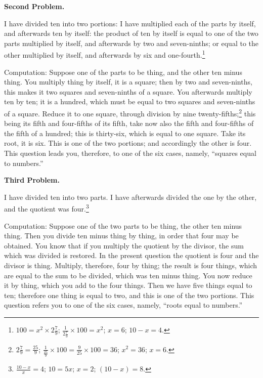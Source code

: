 \vspace{0.3cm}
\noindent\textbf{Second Problem.}

I have divided ten into two portions: I have multiplied each of the parts by itself, and afterwards ten by itself: the product of ten by itself is equal to one of the two parts multiplied by itself, and afterwards by two and seven-ninths; or equal to the other multiplied by itself, and afterwards by six and one-fourth.\footnote{$100 = x^2 \times 2\frac{7}{9}$; $\frac{1}{2\frac{7}{9}} \times 100 = x^2$; $x = 6$; $10 - x = 4$.}

Computation: Suppose one of the parts to be thing, and the other ten minus thing. You multiply thing by itself, it is a square; then by two and seven-ninths, this makes it two squares and seven-ninths of a square. You afterwards multiply ten by ten; it is a hundred, which must be equal to two squares and seven-ninths of a square. Reduce it to one square, through division by nine twenty-fifths;\footnote{$2\frac{7}{9} = \frac{25}{9}$; $\frac{1}{\frac{25}{9}} \times 100 = \frac{9}{25} \times 100 = 36$; $x^2 = 36$; $x = 6$.} this being its fifth and four-fifths of its fifth, take now also the fifth and four-fifths of the fifth of a hundred; this is thirty-six, which is equal to one square. Take its root, it is six. This is one of the two portions; and accordingly the other is four. This question leads you, therefore, to one of the six cases, namely, ``squares equal to numbers.''

\vspace{0.3cm}
\noindent\textbf{Third Problem.}

I have divided ten into two parts. I have afterwards divided the one by the other, and the quotient was four.\footnote{$\frac{10-x}{x} = 4$; $10 = 5x$; $x = 2$; $(10-x) = 8$.}

Computation: Suppose one of the two parts to be thing, the other ten minus thing. Then you divide ten minus thing by thing, in order that four may be obtained. You know that if you multiply the quotient by the divisor, the sum which was divided is restored. In the present question the quotient is four and the divisor is thing. Multiply, therefore, four by thing; the result is four things, which are equal to the sum to be divided, which was ten minus thing. You now reduce it by thing, which you add to the four things. Then we have five things equal to ten; therefore one thing is equal to two, and this is one of the two portions. This question refers you to one of the six cases, namely, ``roots equal to numbers.''

